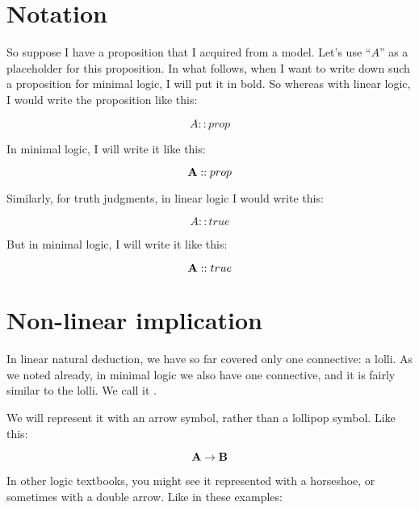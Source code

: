 \documentclass[../../../main.tex]{subfiles}
\begin{document}
\section{Notation}

So suppose I have a proposition that I acquired from a model. Let's use ``$A$'' as a placeholder for this proposition. In what follows, when I want to write down such a proposition for minimal logic, I will put it in bold. So whereas with linear logic, I would write the proposition like this:

\begin{equation*}
  A :: prop
\end{equation*}

\noindent
In minimal logic, I will write it like this:

\begin{equation*}
  \mathbf{A} :: prop
\end{equation*}

\noindent
Similarly, for truth judgments, in linear logic I would write this:

\begin{equation*}
  A :: true
\end{equation*}

\noindent
But in minimal logic, I will write it like this:

\begin{equation*}
  \mathbf{A} :: true
\end{equation*}


\section{Non-linear implication}

In linear natural deduction, we have so far covered only one connective: a lolli. As we noted already, in minimal logic we also have one connective, and it is fairly similar to the lolli. We call it . 

We will represent it with an arrow symbol, rather than a lollipop symbol. Like this: 

\begin{equation*}
  \nd{A \impl/ B}
\end{equation*}

\noindent
In other logic textbooks, you might see it represented with a horseshoe, or sometimes with a double arrow. Like in these examples:
\end{document}

